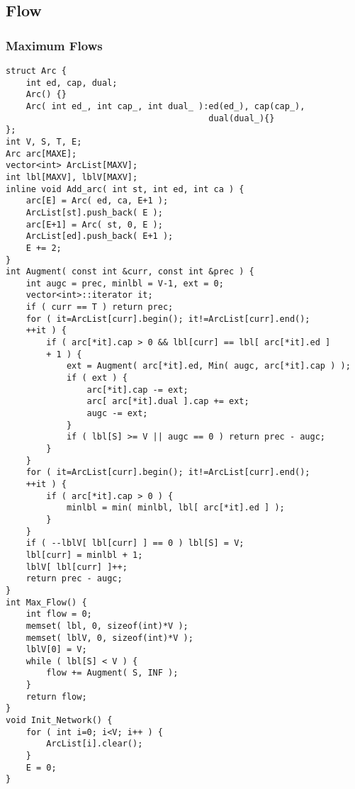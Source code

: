 \documentclass[10pt,twocolumn,oneside]{article}
\begin{document}
\subsection{Flow}
\subsubsection{Maximum Flows}
\begin{verbatim}
struct Arc {
    int ed, cap, dual;
    Arc() {}
    Arc( int ed_, int cap_, int dual_ ):ed(ed_), cap(cap_),
                                        dual(dual_){}
};
int V, S, T, E;
Arc arc[MAXE];
vector<int> ArcList[MAXV];
int lbl[MAXV], lblV[MAXV];
inline void Add_arc( int st, int ed, int ca ) {
    arc[E] = Arc( ed, ca, E+1 );
    ArcList[st].push_back( E );
    arc[E+1] = Arc( st, 0, E );
    ArcList[ed].push_back( E+1 );
    E += 2;
}
int Augment( const int &curr, const int &prec ) {
    int augc = prec, minlbl = V-1, ext = 0;
    vector<int>::iterator it;
    if ( curr == T ) return prec;
    for ( it=ArcList[curr].begin(); it!=ArcList[curr].end();
    ++it ) {
        if ( arc[*it].cap > 0 && lbl[curr] == lbl[ arc[*it].ed ]
        + 1 ) {
            ext = Augment( arc[*it].ed, Min( augc, arc[*it].cap ) );
            if ( ext ) {
                arc[*it].cap -= ext;
                arc[ arc[*it].dual ].cap += ext;
                augc -= ext;
            }
            if ( lbl[S] >= V || augc == 0 ) return prec - augc;
        }
    }
    for ( it=ArcList[curr].begin(); it!=ArcList[curr].end();
    ++it ) {
        if ( arc[*it].cap > 0 ) {
            minlbl = min( minlbl, lbl[ arc[*it].ed ] );
        }
    }
    if ( --lblV[ lbl[curr] ] == 0 ) lbl[S] = V;
    lbl[curr] = minlbl + 1;
    lblV[ lbl[curr] ]++;
    return prec - augc;
}
int Max_Flow() {
    int flow = 0;
    memset( lbl, 0, sizeof(int)*V );
    memset( lblV, 0, sizeof(int)*V );
    lblV[0] = V;
    while ( lbl[S] < V ) {
        flow += Augment( S, INF );
    }
    return flow;
}
void Init_Network() {
    for ( int i=0; i<V; i++ ) {
        ArcList[i].clear();
    }
    E = 0;
}
\end{verbatim}
\end{document}
